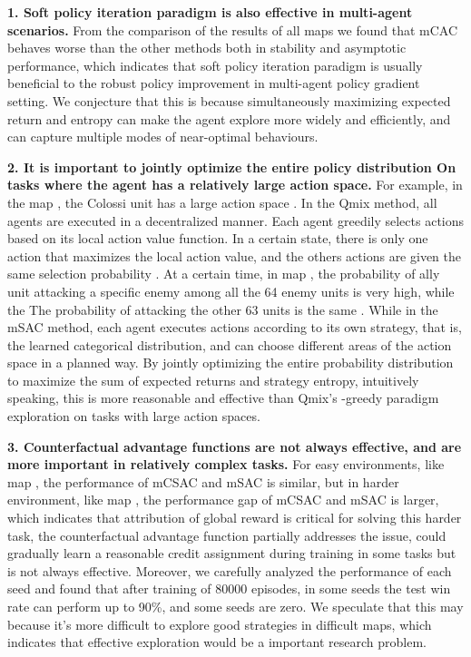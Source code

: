 \documentclass[runningheads]{llncs}
\begin{document}
{\bf 1. Soft policy iteration paradigm is also effective in multi-agent scenarios. }
From the comparison of the results of all maps we found that mCAC behaves worse than the other methods both in stability and asymptotic performance, which indicates that soft policy iteration paradigm is usually beneficial to the robust policy improvement in multi-agent policy gradient setting. We conjecture that this is because simultaneously maximizing expected return and entropy can make the agent explore more widely and efficiently, and can capture multiple modes of near-optimal behaviours. 


{\bf 2. It is important to jointly optimize the entire policy distribution On tasks where the agent has a relatively large action space. }
For example, in the map , the Colossi unit has a large action space . In the Qmix method, all agents are executed in a decentralized manner. Each agent greedily selects actions based on its local action value function. In a certain state, there is only one action that maximizes the local action value, and the others actions are given the same selection probability . At a certain time, in map , the probability of ally unit attacking a specific enemy among all the 64 enemy units is very high, while the The probability of attacking the other 63 units is the same .
While in the mSAC method, each agent executes actions according to its own strategy, that is, the learned categorical distribution, and can choose different areas of the action space in a planned way.
By jointly optimizing the entire probability distribution to maximize the sum of expected returns and strategy entropy, intuitively speaking, this is more reasonable and effective than Qmix's -greedy paradigm exploration on tasks with large action spaces.

{\bf 3. Counterfactual advantage functions are not always effective, and are more important in relatively complex tasks. }
For easy environments, like map , the performance of mCSAC and mSAC is similar, but in harder environment, like map  , the performance gap of mCSAC and mSAC is larger, which indicates that attribution of global reward is critical for solving this harder task, the counterfactual advantage function partially addresses the issue, could gradually learn a reasonable credit assignment during training in some tasks but is not always effective. Moreover, we carefully analyzed the performance of each seed and found that after training of 80000 episodes, in some seeds the test win rate can perform up to 90\%, and some seeds are zero. We speculate that this may because it's more difficult to explore good strategies in difficult maps, which indicates that effective exploration would be a important research problem.
\end{document}

